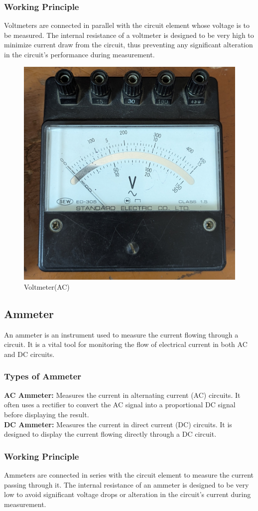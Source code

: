\documentclass[a4paper,12pt]{article}
\begin{document}
\subsubsection{Working Principle}
Voltmeters are connected in parallel with the circuit element whose voltage is to be measured. The internal resistance of a voltmeter is designed to be very high to minimize current draw from the circuit, thus preventing any significant alteration in the circuit's performance during measurement.

	
\begin{figure}[H]
	\centering
	\includegraphics[width=0.42\linewidth]{Images/1}
	\caption{Voltmeter(AC)}
	\label{fig:1}
\end{figure}


	\subsection{Ammeter}
	An ammeter is an instrument used to measure the current flowing through a circuit. It is a vital tool for monitoring the flow of electrical current in both AC and DC circuits.
	
	\subsubsection{Types of Ammeter}
	\textbf{AC Ammeter:} Measures the current in alternating current (AC) circuits. It often uses a rectifier to convert the AC signal into a proportional DC signal before displaying the result. \\
	\textbf{DC Ammeter:} Measures the current in direct current (DC) circuits. It is designed to display the current flowing directly through a DC circuit.
	
	\subsubsection{Working Principle}
	Ammeters are connected in series with the circuit element to measure the current passing through it. The internal resistance of an ammeter is designed to be very low to avoid significant voltage drops or alteration in the circuit’s current during measurement.
	
\end{document}
